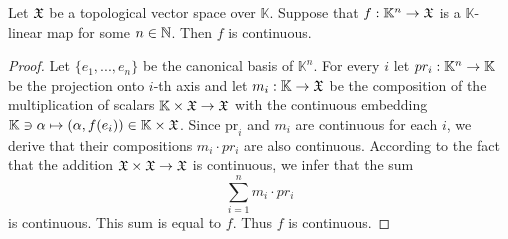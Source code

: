 \begin{fact}\label{fact:linear_morphisms_from_standard_finite_spaces_are_always_continuous}
Let ${\mathfrak X}$ be a topological vector space over $\mathbb{K}$. Suppose that $f:\mathbb{K}^n \rightarrow {\mathfrak X}$ is a $\mathbb{K}$-linear map for some $n\in {\mathbb N}$. Then $f$ is continuous.
\end{fact}
\begin{proof}
Let $\{e_1,...,e_n\}$ be the canonical basis of $\mathbb{K}^n$. For every $i$ let $pr_i:\mathbb{K}^n\rightarrow \mathbb{K}$ be the projection onto $i$-th axis and let $m_{i}:\mathbb{K}\rightarrow {\mathfrak X}$ be the composition of the multiplication of scalars $\mathbb{K}\times {\mathfrak X}\rightarrow {\mathfrak X}$ with the continuous embedding $\mathbb{K} \ni \alpha \mapsto \left(\alpha, f(e_i)\right) \in \mathbb{K}\times {\mathfrak X}$. Since $\mathrm{pr}_i$ and $m_{i}$ are continuous for each $i$, we derive that their compositions $m_{i}\cdot pr_i$ are also continuous. According to the fact that the addition ${\mathfrak X}\times {\mathfrak X}\rightarrow {\mathfrak X}$ is continuous, we infer that the sum
$$\sum_{i=1}^n m_{i}\cdot pr_{i}$$
is continuous. This sum is equal to $f$. Thus $f$ is continuous. 
\end{proof}

